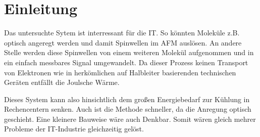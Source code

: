 \chapter{Einleitung}
    Das untersuchte Sytem ist interressant für die IT.
    So könnten Moleküle z.B. optisch angeregt werden und damit Spinwellen im AFM auslösen. 
    An andere Stelle werden diese Spinwellen von einem weiteren Molekül aufgenommen und in ein einfach messbares Signal umgewandelt.
    Da dieser Prozess keinen Transport von Elektronen wie in herkömlichen auf Halbleiter basierenden technischen Geräten entfällt die Joulsche Wärme.

    Dieses System kann also hinsichtlich dem großen Energiebedarf zur Kühlung in Rechencentern senken.
    Auch ist die Methode schneller, da die Anregung optisch geschieht.
    Eine kleinere Bauweise wäre auch Denkbar. 
    Somit wären gleich mehrer Probleme der IT-Industrie gleichzeitig gelöst.

